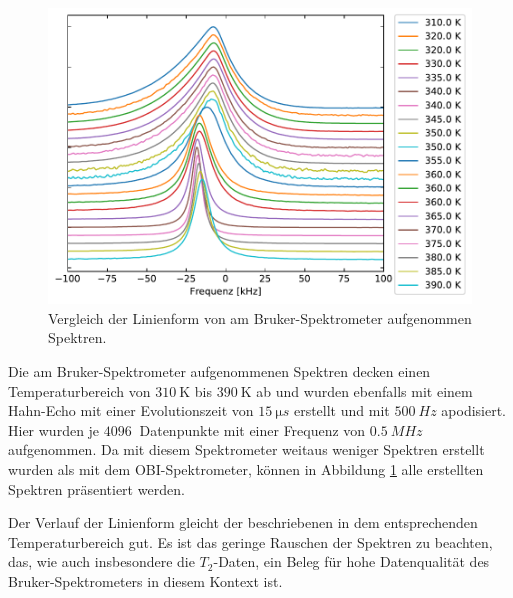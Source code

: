 \begin{figure}
	\begin{center}
		\includegraphics[width=\textwidth]{graphics/plot/bruker_lineshape.pdf}
	\end{center}
	\caption{Vergleich der Linienform von am Bruker-Spektrometer aufgenommen Spektren.} \label{fig:res:bruker_linienform}
\end{figure}
Die am Bruker-Spektrometer aufgenommenen Spektren decken einen Temperaturbereich von $\SI{310}{\kelvin}$ bis $\SI{390}{\kelvin}$ ab und wurden ebenfalls mit einem Hahn-Echo mit einer Evolutionszeit von $\SI{15}{\micro s}$ erstellt und mit $\SI{500}{Hz}$ apodisiert. Hier wurden je $\SI{4096}{}$ Datenpunkte mit einer Frequenz von $\SI{0.5}{MHz}$ aufgenommen. Da mit diesem Spektrometer weitaus weniger Spektren erstellt wurden als mit dem OBI-Spektrometer, können in Abbildung \ref{fig:res:bruker_linienform} alle erstellten Spektren präsentiert werden.

Der Verlauf der Linienform gleicht der beschriebenen in dem entsprechenden Temperaturbereich gut. Es ist das geringe Rauschen der Spektren zu beachten, das, wie auch insbesondere die $T_2$-Daten, ein Beleg für hohe Datenqualität des Bruker-Spektrometers in diesem Kontext ist.

